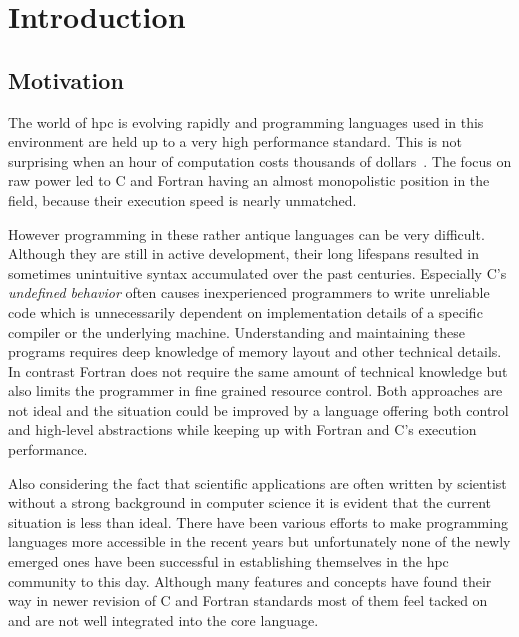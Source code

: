 \chapter{Introduction}
\label{ch:Introduction}


\section{Motivation}
\label{sec:Introduction::Motivation}

The world of \acrlong{hpc} is evolving rapidly and programming languages used in this environment are held up to a very high performance standard. This is not surprising when an hour of computation costs thousands of dollars~\cite{cost_of_science}. The focus on raw power led to C and Fortran having an almost monopolistic position in the field, because their execution speed is nearly unmatched.

However programming in these rather antique languages can be very difficult. Although they are still in active development, their long lifespans resulted in sometimes unintuitive syntax accumulated over the past centuries. Especially C's \textit{undefined behavior} often causes inexperienced programmers to write unreliable code which is unnecessarily dependent on implementation details of a specific compiler or the underlying machine. Understanding and maintaining these programs requires deep knowledge of memory layout and other technical details. In contrast Fortran does not require the same amount of technical knowledge but also limits the programmer in fine grained resource control. Both approaches are not ideal and the situation could be improved by a language offering both control and high-level abstractions while keeping up with Fortran and C's execution performance.

Also considering the fact that scientific applications are often written by scientist without a strong background in computer science it is evident that the current situation is less than ideal. There have been various efforts to make programming languages more accessible in the recent years but unfortunately none of the newly emerged ones have been successful in establishing themselves in the \gls{hpc} community to this day. Although many features and concepts have found their way in newer revision of C and Fortran standards most of them feel tacked on and are not well integrated into the core language.


